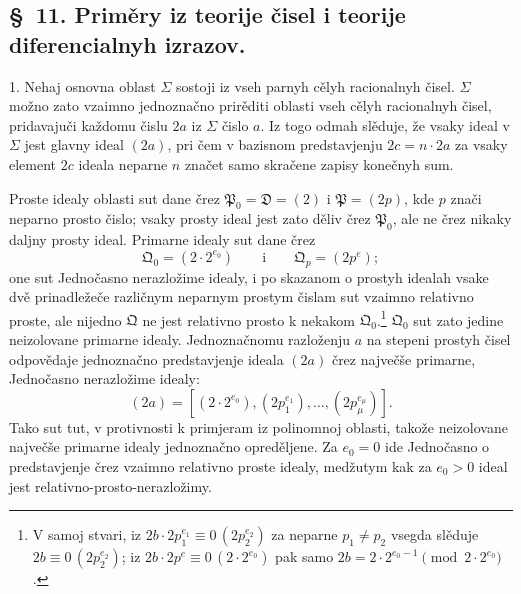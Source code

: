 \documentclass[11pt]{article}
\newcommand{\ideal}[1]{\mathfrak{#1}}
\newcommand{\eqzero}[1]{\equiv 0\,(#1)}
\begin{document}

\setcounter{footnote}{45}
\subsection*{\S~11. Priměry iz teorije čisel i teorije diferencialnyh izrazov.}

1. Nehaj osnovna oblast \(\Sigma\) sostoji iz vseh parnyh cělyh racionalnyh čisel. \(\Sigma\) možno zato vzaimno jednoznačno prirěditi oblasti vseh cělyh racionalnyh čisel, pridavajuči každomu čislu \(2a\) iz \(\Sigma\) čislo \(a\). Iz togo odmah slěduje, že vsaky ideal v \(\Sigma\) jest glavny ideal \((2a)\), pri čem v bazisnom predstavjenju \(2c=n\cdot2a\) za vsaky element \(2c\) ideala neparne \(n\) značet samo skračene zapisy konečnyh sum.

Proste idealy oblasti sut dane črez \(\ideal P_0=\ideal D=(2)\) i \(\ideal P=(2p)\), kde \(p\) znači neparno prosto čislo; vsaky prosty ideal jest zato děliv črez \(\ideal P_0\), ale ne črez nikaky daljny prosty ideal. Primarne idealy sut dane črez
\[
 \ideal Q_0=(2\cdot2^{e_0})
 \qquad\text{i}\qquad
 \ideal Q_p=(2p^e);
\]
one sut Jednočasno nerazložime idealy, i po skazanom o prostyh idealah vsake dvě prinadležeče različnym neparnym prostym čislam sut vzaimno relativno proste, ale nijedno \(\ideal Q\) ne jest relativno prosto k nekakom \(\ideal Q_0\).\footnote{V samoj stvari, iz \(2b\cdot2p_1^{e_1}\eqzero{2p_2^{e_2}}\) za neparne \(p_1\ne p_2\) vsegda slěduje \(2b\eqzero{2p_2^{e_2}}\); iz \(2b\cdot2p^e\eqzero{2\cdot2^{e_0}}\) pak samo \(2b=2\cdot2^{e_0-1}\pmod{2\cdot2^{e_0}}\).} \(\ideal Q_0\) sut zato jedine neizolovane primarne idealy. Jednoznačnomu razloženju \(a\) na stepeni prostyh čisel odpovědaje jednoznačno predstavjenje ideala \((2a)\) črez največše primarne, Jednočasno nerazložime idealy:
\[
 (2a)=[(2\cdot2^{e_0}),(2p_1^{e_1}),
\ldots,(2p_\mu^{e_\mu})].
\]
Tako sut tut, v protivnosti k primjeram iz polinomnoj oblasti, takože neizolovane največše primarne idealy jednoznačno opreděljene. Za \(e_0=0\) ide Jednočasno o predstavjenje črez vzaimno relativno proste idealy, medžutym kak za \(e_0>0\) ideal jest relativno-prosto-nerazložimy.
\end{document}
